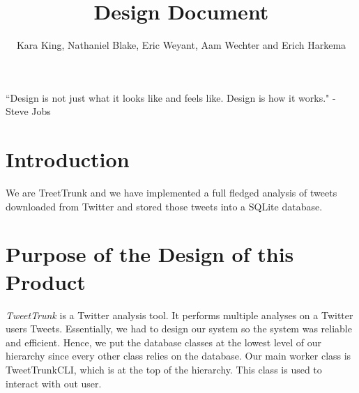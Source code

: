 \documentclass[a4paper, 12pt]{article}
\title{Design Document}
\author{Kara King, Nathaniel Blake, Eric Weyant, Aam Wechter and Erich Harkema}
\begin{document}
\maketitle

\begin{center}
\centering  ``Design is not just what it looks like and feels like. Design is how it works." \newline
\centering - Steve Jobs
\end{center}

\section{Introduction} \label{sec:intro}
We are TreetTrunk and we have implemented a full fledged analysis of tweets downloaded from Twitter and stored those tweets into a SQLite database. 
\section{Purpose of the Design of this Product} \label{sec:purpose}
\begin{adjustwidth}{2em}{0pt}
\textit{TweetTrunk} is a Twitter analysis tool. It performs multiple analyses on a Twitter users Tweets. Essentially, we had to design our system so the system was reliable and efficient. Hence, we put the database classes at the lowest level of our hierarchy since every other class relies on the database. Our main worker class is TweetTrunkCLI, which is at the top of the hierarchy. This class is used to interact with out user.  
\end{adjustwidth}

\tableofcontents
\end{document}
